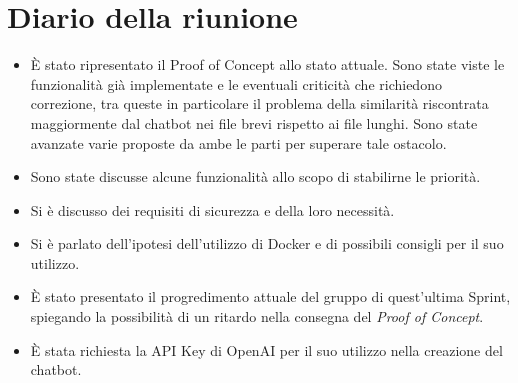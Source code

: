 
\section{Diario della riunione}

\begin{itemize}
    \item È stato ripresentato il Proof of Concept allo stato attuale. Sono state viste le funzionalità già implementate e le eventuali criticità che richiedono correzione, tra queste in particolare il problema della similarità riscontrata maggiormente dal chatbot nei file brevi rispetto ai file lunghi. Sono state avanzate varie proposte da ambe le parti per superare tale ostacolo.
    \item Sono state discusse alcune funzionalità allo scopo di stabilirne le priorità.
    \item Si è discusso dei requisiti di sicurezza e della loro necessità.
    \item Si è parlato dell'ipotesi dell'utilizzo di Docker e di possibili consigli per il suo utilizzo.
    \item È stato presentato il progredimento attuale del gruppo di quest'ultima Sprint, spiegando la possibilità di un ritardo nella consegna del \emph{Proof of Concept}.
    \item È stata richiesta la API Key di OpenAI per il suo utilizzo nella creazione del chatbot.
\end{itemize}